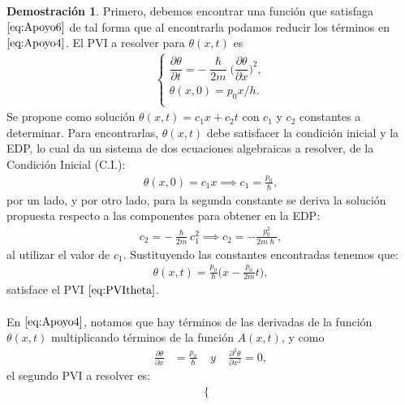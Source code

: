 \documentclass[12pt]{article}
\theoremstyle{definition}
\newtheorem*{demo}{Demostración}
\begin{document}
\begin{demo}
    Primero, debemos encontrar una función que satisfaga $\eqref{eq:Apoyo6}$ de tal forma que al encontrarla podamos reducir los términos en $\eqref{eq:Apoyo4}$. El PVI a resolver para $\theta(x,t)$ es
    \begin{align}
         \left\{ \begin{array}{ll}
         \dfrac{\partial\theta}{\partial t} =  - \dfrac{\hslash}{2m}\bigg(\dfrac{\partial\theta}{\partial x}\bigg)^2 , \\
         \theta(x,0) = p_{0}x/h. \\
         \end{array}
        \right.
        \label{eq:PVItheta}
    \end{align}
    Se propone como solución $\theta(x,t) = c_{1}x + c_{2}t$ con $c_{1}$ y $c_{2}$ constantes a determinar. Para encontrarlas, $\theta(x,t)$ debe satisfacer la condición inicial y la EDP, lo cual da un sistema de dos ecuaciones algebraicas a resolver, de la Condición Inicial (C.I.):
    \begin{align*}
        \theta(x,0) = c_{1}x \implies c_{1} = \frac{p_{0}}{\hslash},
    \end{align*}
    por un lado, y por otro lado, para la segunda constante se deriva la solución propuesta respecto a las componentes para obtener en la EDP:
    \begin{align*}
        c_{2} = -\frac{\hslash}{2m}c_{1}^2
        \implies c_{2} = -\frac{p_{0}^2}{2m\hslash},
    \end{align*} 
    al utilizar el valor de $c_{1}$.
    Sustituyendo las constantes encontradas tenemos que:
    \begin{align}
        \theta(x,t)
         = \frac{p_{0}}{\hslash}\bigg(x - \frac{p_{0}}{2m}t\bigg),
         \label{eq:PhaseSol}
    \end{align}
    satisface el PVI $\eqref{eq:PVItheta}$.
    \\ \\
    En $\eqref{eq:Apoyo4}$, notamos que hay términos de las derivadas de la función $\theta(x,t)$ multiplicando términos de la función $A(x,t)$, y como
    \begin{align*}
        \frac{\partial\theta}{\partial x} & = \frac{p_{0}}{\hslash} \:
        \:\:\:\:
        y \:\:\:\:\:
        \frac{\partial^2 \theta}{\partial x^2}  = 0,
    \end{align*}
    el segundo PVI a resolver es:
    \begin{align}
        \left\{ \begin{array}{ll}

\end{array}
\end{align}
\end{demo}
\end{document}
